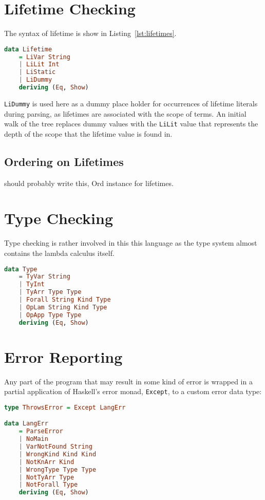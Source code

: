 \section{Lifetime Checking}
The syntax of lifetime is show in Listing~\ref{lst:lifetimes}. 

\begin{lstlisting}[caption=Haskell representation of Lifetimes.., language=Haskell, label={lst:lifetimes}]
data Lifetime 
    = LiVar String
    | LiLit Int
    | LiStatic
    | LiDummy
    deriving (Eq, Show)
\end{lstlisting}

\lstinline{LiDummy} is used here as a dummy place holder for occurrences of
lifetime literals during parsing, as lifetimes are associated with the scope of
terms. An initial walk of the tree replaces dummy values with the
\lstinline{LiLit} value that represents the depth of the scope that the
lifetime value is found in.

\subsection{Ordering on Lifetimes}
should probably write this, Ord instance for lifetimes.

\section{Type Checking}
Type checking is rather involved in this this language as the type system
almost contains the lambda calculus itself.

\begin{lstlisting}[caption=Haskell representation of Types., language=Haskell, label={lst:types}]
data Type
    = TyVar String
    | TyInt
    | TyArr Type Type
    | Forall String Kind Type
    | OpLam String Kind Type
    | OpApp Type Type
    deriving (Eq, Show)
\end{lstlisting}

\section{Error Reporting}
Any part of the program that may result in some kind of error is wrapped in
a partial application of Haskell's error monad, \lstinline{Except}, to a custom
error data type:

\begin{lstlisting}[caption=Partially applied error monad and langauge errors., language=Haskell, label={lst:types}]
type ThrowsError = Except LangErr

data LangErr
    = ParseError
    | NoMain
    | VarNotFound String
    | WrongKind Kind Kind
    | NotKnArr Kind
    | WrongType Type Type
    | NotTyArr Type
    | NotForall Type
    deriving (Eq, Show)
\end{lstlisting}

